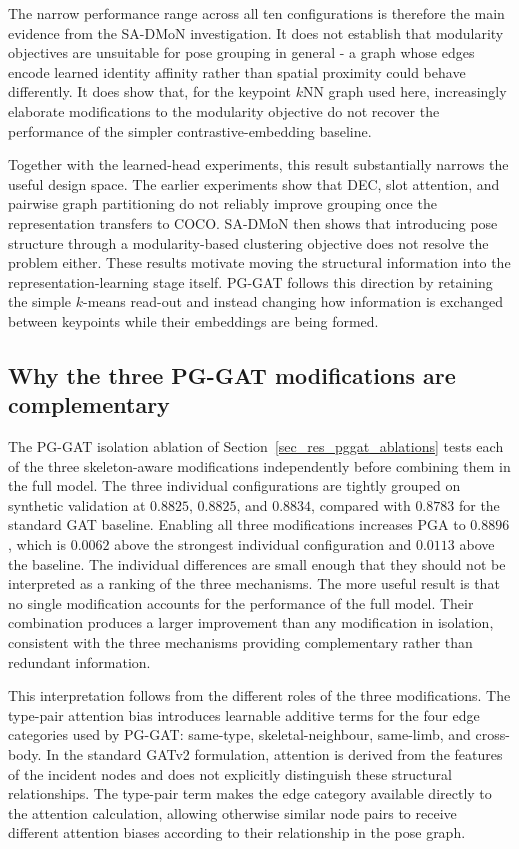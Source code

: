 The narrow performance range across all ten configurations is therefore
the main evidence from the SA-DMoN investigation.
It does not establish that modularity objectives are unsuitable for pose
grouping in general -
a graph whose edges encode learned identity affinity rather than
spatial proximity could behave differently.
It does show that, for the keypoint $k$NN graph used here,
increasingly elaborate modifications to the modularity objective do not
recover the performance of the simpler contrastive-embedding baseline.

Together with the learned-head experiments,
this result substantially narrows the useful design space.
The earlier experiments show that DEC,
slot attention,
and pairwise graph partitioning do not reliably improve grouping once
the representation transfers to COCO.
SA-DMoN then shows that introducing pose structure through a
modularity-based clustering objective does not resolve the problem either.
These results motivate moving the structural information into the
representation-learning stage itself.
PG-GAT follows this direction by retaining the simple $k$-means read-out
and instead changing how information is exchanged between keypoints
while their embeddings are being formed.

\subsection{Why the three PG-GAT modifications are complementary}
\label{sec_disc_embedding_pggat}

The PG-GAT isolation ablation of
Section~\ref{sec_res_pggat_ablations} tests each of the three
skeleton-aware modifications independently before combining them in the
full model.
The three individual configurations are tightly grouped on synthetic
validation at $0.8825$,
$0.8825$, and $0.8834$,
compared with $0.8783$ for the standard GAT baseline.
Enabling all three modifications increases PGA to $0.8896$,
which is $0.0062$ above the strongest individual configuration
and $0.0113$ above the baseline.
The individual differences are small enough that they should not be
interpreted as a ranking of the three mechanisms.
The more useful result is that no single modification accounts for the
performance of the full model.
Their combination produces a larger improvement than any modification
in isolation,
consistent with the three mechanisms providing complementary rather
than redundant information.

This interpretation follows from the different roles of the three
modifications.
The type-pair attention bias introduces learnable additive terms for
the four edge categories used by PG-GAT:
same-type,
skeletal-neighbour,
same-limb,
and cross-body.
In the standard GATv2 formulation,
attention is derived from the features of the incident nodes and does
not explicitly distinguish these structural relationships.
The type-pair term makes the edge category available directly to the
attention calculation,
allowing otherwise similar node pairs to receive different attention
biases according to their relationship in the pose graph.

